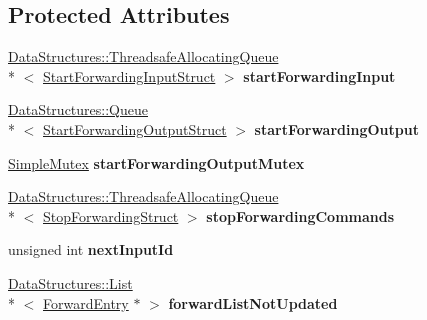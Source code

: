 \subsection*{Protected Attributes}
\begin{DoxyCompactItemize}
\item 
\hypertarget{class_rak_net_1_1_u_d_p_forwarder_ad88a5c4d36ca9798f7d18a15e706ad2d}{\hyperlink{class_data_structures_1_1_threadsafe_allocating_queue}{Data\-Structures\-::\-Threadsafe\-Allocating\-Queue}\\*
$<$ \hyperlink{struct_rak_net_1_1_u_d_p_forwarder_1_1_start_forwarding_input_struct}{Start\-Forwarding\-Input\-Struct} $>$ {\bfseries start\-Forwarding\-Input}}\label{class_rak_net_1_1_u_d_p_forwarder_ad88a5c4d36ca9798f7d18a15e706ad2d}

\item 
\hypertarget{class_rak_net_1_1_u_d_p_forwarder_a6f36c50bebfcaf3f86b75bafa60f0a00}{\hyperlink{class_data_structures_1_1_queue}{Data\-Structures\-::\-Queue}\\*
$<$ \hyperlink{struct_rak_net_1_1_u_d_p_forwarder_1_1_start_forwarding_output_struct}{Start\-Forwarding\-Output\-Struct} $>$ {\bfseries start\-Forwarding\-Output}}\label{class_rak_net_1_1_u_d_p_forwarder_a6f36c50bebfcaf3f86b75bafa60f0a00}

\item 
\hypertarget{class_rak_net_1_1_u_d_p_forwarder_a60073d896716635e87cf4442c617173a}{\hyperlink{class_rak_net_1_1_simple_mutex}{Simple\-Mutex} {\bfseries start\-Forwarding\-Output\-Mutex}}\label{class_rak_net_1_1_u_d_p_forwarder_a60073d896716635e87cf4442c617173a}

\item 
\hypertarget{class_rak_net_1_1_u_d_p_forwarder_a5e3e001b7111a0b0029fed893b0190c9}{\hyperlink{class_data_structures_1_1_threadsafe_allocating_queue}{Data\-Structures\-::\-Threadsafe\-Allocating\-Queue}\\*
$<$ \hyperlink{struct_rak_net_1_1_u_d_p_forwarder_1_1_stop_forwarding_struct}{Stop\-Forwarding\-Struct} $>$ {\bfseries stop\-Forwarding\-Commands}}\label{class_rak_net_1_1_u_d_p_forwarder_a5e3e001b7111a0b0029fed893b0190c9}

\item 
\hypertarget{class_rak_net_1_1_u_d_p_forwarder_a57b1ca07685f16845ead1c5fa08e1ccb}{unsigned int {\bfseries next\-Input\-Id}}\label{class_rak_net_1_1_u_d_p_forwarder_a57b1ca07685f16845ead1c5fa08e1ccb}

\item 
\hypertarget{class_rak_net_1_1_u_d_p_forwarder_a492194638bd151ca806cd0212ef31723}{\hyperlink{class_data_structures_1_1_list}{Data\-Structures\-::\-List}\\*
$<$ \hyperlink{struct_rak_net_1_1_u_d_p_forwarder_1_1_forward_entry}{Forward\-Entry} $\ast$ $>$ {\bfseries forward\-List\-Not\-Updated}}\label{class_rak_net_1_1_u_d_p_forwarder_a492194638bd151ca806cd0212ef31723}


\end{DoxyCompactItemize}
